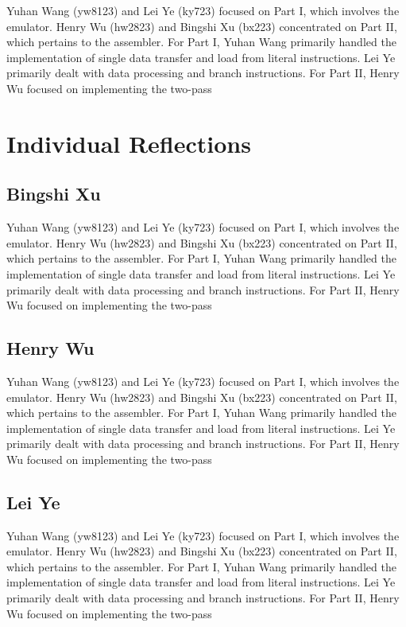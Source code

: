 \documentclass[11pt]{article}
\begin{document}
Yuhan Wang (yw8123) and Lei Ye (ky723) focused on Part I, which involves the emulator. Henry Wu (hw2823) and Bingshi Xu (bx223) concentrated on Part II, which pertains to the assembler.
For Part I, Yuhan Wang primarily handled the implementation of single data transfer and load from literal instructions. Lei Ye primarily dealt with data processing and branch instructions.
For Part II, Henry Wu focused on implementing the two-pass 

\section{Individual Reflections}

\subsection{Bingshi Xu}

Yuhan Wang (yw8123) and Lei Ye (ky723) focused on Part I, which involves the emulator. Henry Wu (hw2823) and Bingshi Xu (bx223) concentrated on Part II, which pertains to the assembler.
For Part I, Yuhan Wang primarily handled the implementation of single data transfer and load from literal instructions. Lei Ye primarily dealt with data processing and branch instructions.
For Part II, Henry Wu focused on implementing the two-pass 

\subsection{Henry Wu}

Yuhan Wang (yw8123) and Lei Ye (ky723) focused on Part I, which involves the emulator. Henry Wu (hw2823) and Bingshi Xu (bx223) concentrated on Part II, which pertains to the assembler.
For Part I, Yuhan Wang primarily handled the implementation of single data transfer and load from literal instructions. Lei Ye primarily dealt with data processing and branch instructions.
For Part II, Henry Wu focused on implementing the two-pass 

\subsection{Lei Ye}

Yuhan Wang (yw8123) and Lei Ye (ky723) focused on Part I, which involves the emulator. Henry Wu (hw2823) and Bingshi Xu (bx223) concentrated on Part II, which pertains to the assembler.
For Part I, Yuhan Wang primarily handled the implementation of single data transfer and load from literal instructions. Lei Ye primarily dealt with data processing and branch instructions.
For Part II, Henry Wu focused on implementing the two-pass 
\end{document}
